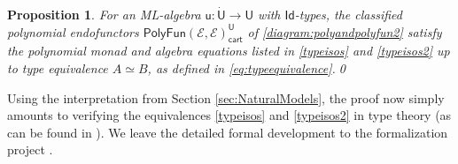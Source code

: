 \documentclass[12pt,reqno]{amsart}
\newcommand{\EE}{\ensuremath{\mathcal{E}}}
\renewcommand{\to}{\ensuremath{\rightarrow}}
\newcommand{\Id}{\mathsf{Id}}
\renewcommand{\t}{\ensuremath{\mathsf{u}}}
\newcommand{\T}{\ensuremath{\mathsf{U}}}
\newcommand{\TT}{\ensuremath{\dot{\mathsf{U}}}}
\newtheorem{proposition}[theorem]{Proposition}
\theoremstyle{remark}
\theoremstyle{definition}
\begin{document}
\begin{proposition}\label{prop:monad}
For an ML-algebra $\t : \TT \to \T$ with $\Id{}$-types, the classified polynomial endofunctors $\mathsf{PolyFun}(\EE, \EE)_{\mathsf{cart}}^\T$ of \eqref{diagram:polyandpolyfun2} satisfy the polynomial monad and algebra equations listed in \eqref{typeisos} and \eqref{typeisos2} up to type equivalence $A\simeq B$, as defined in \eqref{eq:typeequivalence}.\qed
\end{proposition}


Using the interpretation from Section \ref{sec:NaturalModels}, the proof now simply amounts to verifying the equivalences \eqref{typeisos} and \eqref{typeisos2}  in type theory (as can be found in \cite[Chapter 2]{HoTTbook}).  We leave the detailed formal development to the formalization project \cite{HoTTLean}.
  
\end{document}
